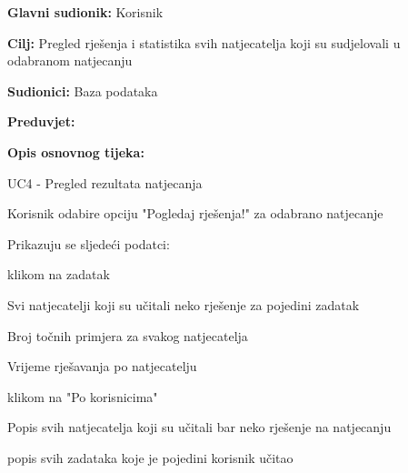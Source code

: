 					\noindent {}
					\begin{packed_item}
						
						\item \textbf{Glavni sudionik: }Korisnik
						\item  \textbf{Cilj:} Pregled rješenja i statistika svih natjecatelja koji su sudjelovali u odabranom natjecanju
						\item  \textbf{Sudionici:} Baza podataka
						\item  \textbf{Preduvjet:} 
						\item  \textbf{Opis osnovnog tijeka:}
						
						\item[] \begin{packed_enum}
							
							\item UC4 - Pregled rezultata natjecanja
							\item Korisnik odabire opciju "Pogledaj rješenja!" za odabrano natjecanje
							\item Prikazuju se sljedeći podatci:
							\item[] \begin{packed_enum}
								\item klikom na zadatak
								\item[] \begin{packed_enum}
									\item Svi natjecatelji koji su učitali neko rješenje za pojedini zadatak
									\item Broj točnih primjera za svakog natjecatelja
									\item Vrijeme rješavanja po natjecatelju
								\end{packed_enum}
								\item klikom na "Po korisnicima"
								\item[] \begin{packed_enum}
									\item Popis svih natjecatelja koji su učitali bar neko rješenje na natjecanju
									\item popis svih zadataka koje je pojedini korisnik učitao
								\end{packed_enum}
							\end{packed_enum}
						\end{packed_enum}
					\end{packed_item}																				


